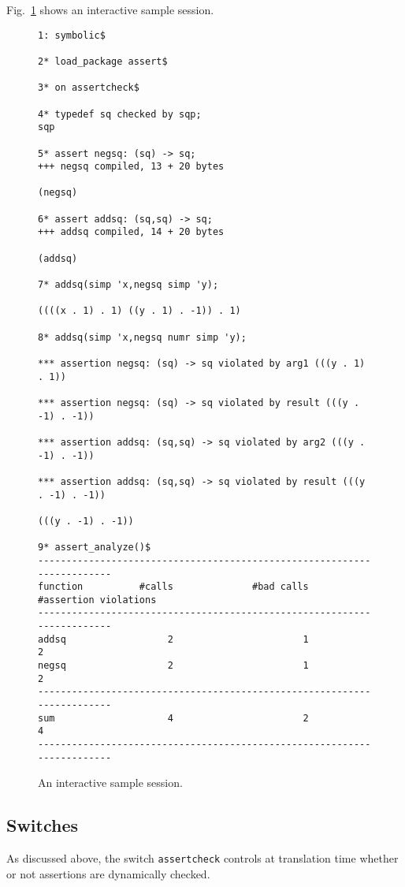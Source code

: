 Fig.~\ref{FIG:sample} shows an interactive sample session.
%
\begin{figure}
  \begin{small}
\begin{verbatim}
1: symbolic$

2* load_package assert$

3* on assertcheck$

4* typedef sq checked by sqp;
sqp

5* assert negsq: (sq) -> sq;
+++ negsq compiled, 13 + 20 bytes

(negsq)

6* assert addsq: (sq,sq) -> sq;
+++ addsq compiled, 14 + 20 bytes

(addsq)

7* addsq(simp 'x,negsq simp 'y);

((((x . 1) . 1) ((y . 1) . -1)) . 1)

8* addsq(simp 'x,negsq numr simp 'y);

*** assertion negsq: (sq) -> sq violated by arg1 (((y . 1) . 1))

*** assertion negsq: (sq) -> sq violated by result (((y . -1) . -1))

*** assertion addsq: (sq,sq) -> sq violated by arg2 (((y . -1) . -1))

*** assertion addsq: (sq,sq) -> sq violated by result (((y . -1) . -1))

(((y . -1) . -1))

9* assert_analyze()$
------------------------------------------------------------------------
function          #calls              #bad calls   #assertion violations
------------------------------------------------------------------------
addsq                  2                       1                       2
negsq                  2                       1                       2
------------------------------------------------------------------------
sum                    4                       2                       4
------------------------------------------------------------------------
\end{verbatim}
  \end{small}
  \caption{An interactive sample session.\label{FIG:sample}}
\end{figure}

\subsection{Switches}
As discussed above, the switch \texttt{assertcheck} controls at
translation time whether or not assertions are dynamically checked.

